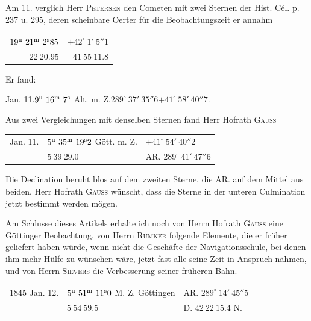 Am 11. verglich Herr \textsc{Petersen} den Cometen mit zwei Sternen der Hist. Cél. p. 237 u. 295, deren scheinbare Oerter für die Beobachtungszeit er annahm

\begin{center}
\begin{tabular}{rr}
$19^{\rm u}\ 21^{\rm m}\ 2^{\rm s}85$ & $+42^\circ\ 1'\ 5''1$ \\
$22\ 20.95$ & $41\ 55\ 11.8$ \\
\end{tabular}
\end{center}
\noindent Er fand:

\begin{center}
Jan. 11.\quad $9^{\rm u}\ 16^{\rm m}\ 7^{\rm s}$ Alt. m. Z.\quad $289^\circ\ 37'\ 35''6$\quad $+41^\circ\ 58'\ 40''7$.
\end{center}

Aus zwei Vergleichungen mit denselben Sternen fand Herr Hofrath \textsc{Gauss}

\begin{center}
\begin{tabular}{lll}
Jan. 11. & $5^{\rm u}\ 35^{\rm m}\ 19^{\rm s}2$ Gött. m. Z. & $+41^\circ\ 54'\ 40''2$ \\
 & $5\ 39\ 29.0$ & AR. $289^\circ\ 41'\ 47''6$ \\
\end{tabular}
\end{center}

Die Declination beruht blos auf dem zweiten Sterne, die AR. auf dem Mittel aus beiden. Herr Hofrath \textsc{Gauss} wünscht, dass die Sterne in der unteren Culmination jetzt bestimmt werden mögen.

Am Schlusse dieses Artikels erhalte ich noch von Herrn Hofrath \textsc{Gauss} eine Göttinger Beobachtung, von Herrn \textsc{Rümker} folgende Elemente, die er früher geliefert haben würde, wenn nicht die Geschäfte der Navigationsschule, bei denen ihm mehr Hülfe zu wünschen wäre, jetzt fast alle seine Zeit in Anspruch nähmen, und von Herrn \textsc{Sievers} die Verbesserung seiner früheren Bahn.

\begin{center}
\setlength{\tabcolsep}{3pt}
\begin{tabular}{lll}
1845 Jan. 12. & $5^{\rm u}\ 51^{\rm m}\ 11^{\rm s}0$ M. Z. Göttingen & AR. $289^\circ\ 14'\ 45''5$ \\
 & $5\ 54\ 59.5$ & D. $42\ 22\ 15.4$ N. \\
\end{tabular}
\end{center}

